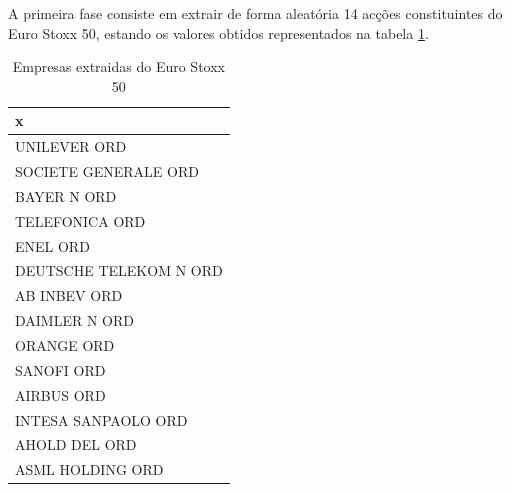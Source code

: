 \documentclass[
  12pt,
  brazil,
  a4paper,
  openany]{book}
\newenvironment{Shaded}{\begin{snugshade}}{\end{snugshade}}
\newcommand{\DataTypeTok}[1]{\textcolor[rgb]{0.13,0.29,0.53}{#1}}
\newcommand{\DecValTok}[1]{\textcolor[rgb]{0.00,0.00,0.81}{#1}}
\newcommand{\KeywordTok}[1]{\textcolor[rgb]{0.13,0.29,0.53}{\textbf{#1}}}
\newcommand{\NormalTok}[1]{#1}
\newcommand{\OperatorTok}[1]{\textcolor[rgb]{0.81,0.36,0.00}{\textbf{#1}}}
\newcommand{\OtherTok}[1]{\textcolor[rgb]{0.56,0.35,0.01}{#1}}
\newcommand{\StringTok}[1]{\textcolor[rgb]{0.31,0.60,0.02}{#1}}
\begin{document}
A primeira fase consiste em extrair de forma aleatória 14 acções constituintes do Euro Stoxx 50, estando os valores obtidos representados na tabela \ref{tab:nice-tab}.

\begin{Shaded}
\end{Shaded}

\begin{table}[!h]

\caption{\label{tab:nice-tab}Empresas extraidas do Euro Stoxx 50}
\centering
\begin{tabular}[t]{l}
\toprule
x\\
\midrule
UNILEVER ORD\\
SOCIETE GENERALE ORD\\
BAYER N ORD\\
TELEFONICA ORD\\
ENEL ORD\\
\addlinespace
DEUTSCHE TELEKOM N ORD\\
AB INBEV ORD\\
DAIMLER N ORD\\
ORANGE ORD\\
SANOFI ORD\\
\addlinespace
AIRBUS ORD\\
INTESA SANPAOLO ORD\\
AHOLD DEL ORD\\
ASML HOLDING ORD\\
\bottomrule
\end{tabular}
\end{table}
\end{document}
